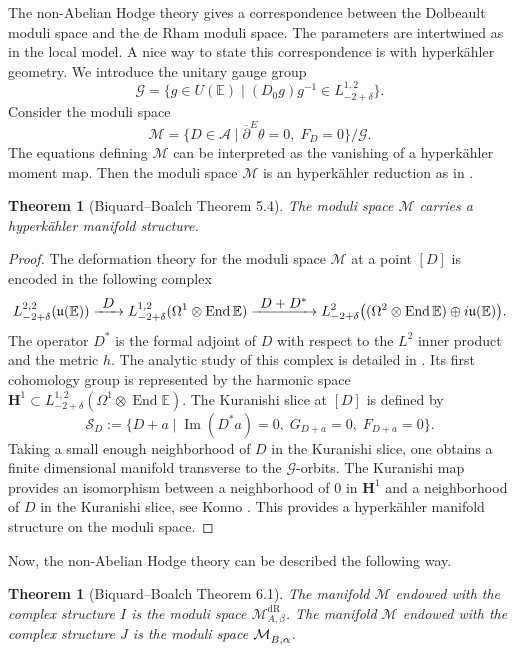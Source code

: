 \documentclass[11pt]{article}
\def\To#1{\mathchoice{\xrightarrow{\textstyle\kern4pt#1\kern3pt}}{\stackrel{#1}{\longrightarrow}}{}{}}
\newcommand{\NoChangel}[1]{%
\expandafter\let\csname old\string#1\endcsname=#1
\let#1=\relax
\newcommand{#1}{\mathcode`l="716C\csname old\string#1\endcsname\mathcode`l="7160 }%
}
\newcommand{\Dol}{\mathrm{Dol}}\NoChangel{\Dol}
\newcommand{\dR}{\mathrm{dR}}
\theoremstyle{definition}
\theoremstyle{plain}
\newtheorem{theorem}[definition]{Theorem}
\DeclareMathOperator{\End}{End}
\DeclareMathOperator{\Imm}{Im}
\newcommand{\inv}{^{-1}}
\begin{document}
The non-Abelian Hodge theory gives a correspondence between the Dolbeault moduli space and the de Rham moduli space. The parameters are intertwined as in the local model. A nice way to state this correspondence is with hyperkähler geometry. We introduce the unitary gauge group
\[
\mathcal{G}=\lbrace g\in U(\mathbb{E}) \mid(D_0 g) g\inv \in L^{1,2}_{-2+\delta}\rbrace.
\]
Consider the moduli space
\[
\mathcal{M}=\lbrace D\in\mathcal{A} \mid \overline{\partial}^E \theta=0, \; F_D=0\rbrace/\mathcal{G}.
\]
The equations defining $\mathcal{M}$ can be interpreted as the vanishing of a hyperkähler moment map. Then the moduli space $\mathcal{M}$ is an hyperkähler reduction as in \cite{Hitchin_Karlhede_Lindstrom_Rocek}.
\begin{theorem}[Biquard--Boalch \cite{Biquard_Boalch_2004} Theorem 5.4]
The moduli space $\mathcal{M}$ carries a hyperkähler manifold structure.
\end{theorem}
\begin{proof}
The deformation theory for the moduli space $\mathcal{M}$ at a point $[D]$ is encoded in the following complex
\[
L^{2,2}_{-2+\delta}(\mathfrak{u}(\mathbb{E})) \To{D} L^{1,2}_{-2+\delta}(\Omega^1\otimes\End \mathbb{E}) \To{D+D^*} L^{2}_{-2 +\delta} \bigl((\Omega^2\otimes \End \mathbb{E})\oplus i\mathfrak{u}(\mathbb{E})\bigr).
\]
The operator $D^*$ is the formal adjoint of $D$ with respect to the $L^2$ inner product and the metric $h$. The analytic study of this complex is detailed in \cite{Biquard_Boalch_2004}. Its first cohomology group is represented by the harmonic space $\boldsymbol{H}^1 \subset L^{1,2}_{-2+\delta} \left(\Omega^1\otimes\End \mathbb{E}\right) $. The Kuranishi slice at $[D]$ is defined by
\begin{equation}\label{eq_kuranishi_slice}
\mathcal{S}_D :=\lbrace D+a \mid \Imm(D^* a)= 0, \; G_{D+a}=0, \; F_{D+a}=0\rbrace.
\end{equation}
Taking a small enough neighborhood of $D$ in the Kuranishi slice, one obtains a finite dimensional manifold transverse to the $\mathcal{G}$-orbits. The Kuranishi map provides an isomorphism between a neighborhood of $0$ in $\boldsymbol{H}^1$ and a neighborhood of $D$ in the Kuranishi slice, see Konno \cite[Lem.\,3.8, Th.\,3.9]{Konno}. This provides a hyperkähler manifold structure on the moduli space.
\end{proof}

Now, the non-Abelian Hodge theory can be described the following way.
\begin{theorem}[Biquard--Boalch \cite{Biquard_Boalch_2004} Theorem 6.1]
The manifold $\mathcal{M}$ endowed with the complex structure $I$ is the moduli space $\mathcal{M}^{\dR}_{A,\beta}$. The manifold $\mathcal{M}$ endowed with the complex structure $J$ is the moduli space $\mathcal{M}^{\Dol}_{B,\alpha}$.
\end{theorem}
\end{document}
